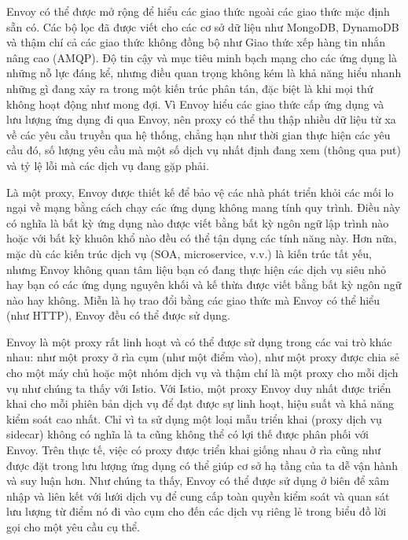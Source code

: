 \documentclass[12pt,a4paper]{report}
\begin{document}
		Envoy có thể được mở rộng để hiểu các giao thức ngoài các giao thức mặc định sẵn có. Các bộ lọc đã được viết cho các cơ sở dữ liệu như MongoDB, DynamoDB và thậm chí cả các giao thức không đồng bộ như Giao thức xếp hàng tin nhắn nâng cao (AMQP). Độ tin cậy và mục tiêu minh bạch mạng cho các ứng dụng là những nỗ lực đáng kể, nhưng điều quan trọng không kém là khả năng hiểu nhanh những gì đang xảy ra trong một kiến trúc phân tán, đặc biệt là khi mọi thứ không hoạt động như mong đợi. Vì Envoy hiểu các giao thức cấp ứng dụng và lưu lượng ứng dụng đi qua Envoy, nên proxy có thể thu thập nhiều dữ liệu từ xa về các yêu cầu truyền qua hệ thống, chẳng hạn như thời gian thực hiện các yêu cầu đó, số lượng yêu cầu mà một số dịch vụ nhất định đang xem (thông qua put) và tỷ lệ lỗi mà các dịch vụ đang gặp phải.
		
		\newpage Là một proxy, Envoy được thiết kế để bảo vệ các nhà phát triển khỏi các mối lo ngại về mạng bằng cách chạy các ứng dụng không mang tính quy trình. Điều này có nghĩa là bất kỳ ứng dụng nào được viết bằng bất kỳ ngôn ngữ lập trình nào hoặc với bất kỳ khuôn khổ nào đều có thể tận dụng các tính năng này. Hơn nữa, mặc dù các kiến trúc dịch vụ (SOA, microservice, v.v.) là kiến trúc tất yếu, nhưng Envoy không quan tâm liệu bạn có đang thực hiện các dịch vụ siêu nhỏ hay bạn có các ứng dụng nguyên khối và kế thừa được viết bằng bất kỳ ngôn ngữ nào hay không. Miễn là họ trao đổi bằng các giao thức mà Envoy có thể hiểu (như HTTP), Envoy đều có thể được sử dụng.
		
		Envoy là một proxy rất linh hoạt và có thể được sử dụng trong các vai trò khác nhau: như một proxy ở rìa cụm (như một điểm vào), như một proxy được chia sẻ cho một máy chủ hoặc một nhóm dịch vụ và thậm chí là một proxy cho mỗi dịch vụ như chúng ta thấy với Istio. Với Istio, một proxy Envoy duy nhất được triển khai cho mỗi phiên bản dịch vụ để đạt được sự linh hoạt, hiệu suất và khả năng kiểm soát cao nhất. Chỉ vì ta sử dụng một loại mẫu triển khai (proxy dịch vụ sidecar) không có nghĩa là ta cũng không thể có lợi thế được phân phối với Envoy. Trên thực tế, việc có proxy được triển khai giống nhau ở rìa cũng như được đặt trong lưu lượng ứng dụng có thể giúp cơ sở hạ tầng của ta dễ vận hành và suy luận hơn. Như chúng ta thấy, Envoy có thể được sử dụng ở biên để xâm nhập và liên kết với lưới dịch vụ để cung cấp toàn quyền kiểm soát và quan sát lưu lượng từ điểm nó đi vào cụm cho đến các dịch vụ riêng lẻ trong biểu đồ lời gọi cho một yêu cầu cụ thể.
		
\end{document}
